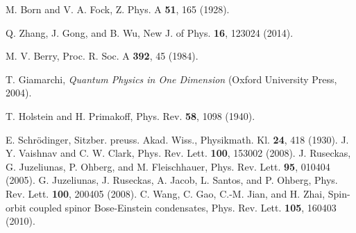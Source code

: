 \documentclass[pra,epsfig,rotate,superscriptaddress,showpacs]{revtex4}
\begin{document}
\begin{thebibliography}{99}
 M. Born and V. A. Fock, Z. Phys. A {\bf 51}, 165 (1928).

 Q. Zhang, J. Gong, and B. Wu, New J. of Phys. {\bf 16}, 123024 (2014).


 M. V.  Berry, Proc. R. Soc. A {\bf 392}, 45 (1984).


 T.  Giamarchi, {\it Quantum Physics in One Dimension} (Oxford University Press, 2004).



 T. Holstein and H. Primakoff, Phys. Rev. {\bf 58}, 1098 (1940).

 E. Schr\"odinger, Sitzber. preuss. Akad. Wiss., Physikmath. Kl. {\bf 24}, 418 (1930).
 J. Y. Vaishnav and C. W. Clark, Phys. Rev. Lett. {\bf 100}, 153002 (2008).
 J. Ruseckas, G. Juzeliunas, P. Ohberg, and M. Fleischhauer, Phys. Rev. Lett. {\bf 95}, 010404 (2005).
 G. Juzeliunas, J. Ruseckas, A. Jacob, L. Santos, and P. Ohberg,
Phys. Rev. Lett. {\bf 100}, 200405 (2008).
  C. Wang, C. Gao, C.-M. Jian, and H. Zhai, Spin-orbit coupled
spinor Bose-Einstein condensates, Phys. Rev. Lett. {\bf 105}, 160403 (2010).


\end{thebibliography}
\end{document}

